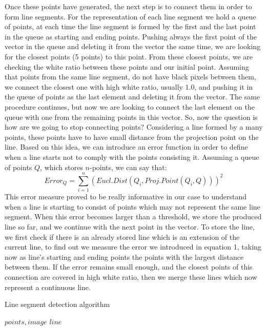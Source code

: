 \documentclass[	DIV=calc,%
							paper=a4,%
							fontsize=9pt,%
							twocolumn]{scrartcl}	 					%
\begin{document}
Once these points have generated, the next step is to connect them in order to form line segments. For the representation of each line segment we hold a queue of points, at each time the line segment is formed by the first and the last point in the queue as starting and ending points. Pushing always the first point of the vector in the queue and deleting it from the vector the same time, we are looking for the closest points (5 points) to this point. From these closest points, we are checking the white ratio between these points and our initial point. Assuming that points from the same line segment, do not have black pixels between them, we connect the closest one with high white ratio, usually $1.0$, and pushing it in the queue of points as the last element and deleting it from the vector. The same procedure continues, but now we are looking to connect the last element on the queue with one from the remaining points in this vector. So, now the question is how are we going to stop connecting points? Considering a line formed by a many points, these points have to have small distance from the projection point on the line. Based on this idea, we can introduce an error function in order to define when a line starts not to comply with the points consisting it. Assuming a queue of points $Q$, which stores $n$-points, we can say that:
\begin{equation}
Error_Q = \sum_{i=1}^{n}(Eucl.Dist(Q_i, Proj.Point(Q_i,Q)))^2
\end{equation}
This error measure proved to be really informative in our case to understand when a line is starting to consist of points which may not represent the same line segment. When this error becomes larger than a threshold, we store the produced line so far, and we continue with the next point in the vector. To store the line, we first check if there is an already stored line which is an extension of the current line, to find out we measure the error we introduced in equation 1, taking now as line's starting and ending points the points with the largest distance between them. If the error remains small enough, and the closest points of this connection are covered in high white ratio, then we merge these lines which now represent a continuous line. 
\begin{algorithm}[t!]
\caption{Line segment detection algorithm}
\label{line}
\begin{algorithmic}[1]
$points, image$
$line$
\ELSE
{}
\ENDIF
\ENDWHILE
\end{algorithmic}
\end{algorithm}
\end{document}
